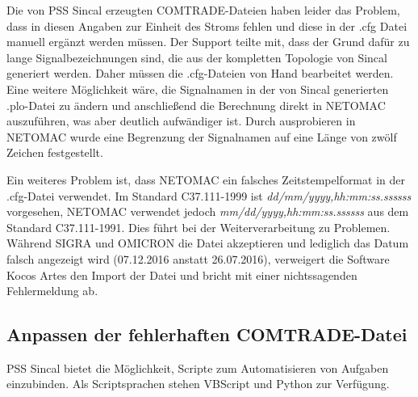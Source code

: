 \documentclass{scrartcl}
\begin{document}
\begin{onehalfspace}
Die von PSS Sincal erzeugten COMTRADE-Dateien haben leider das Problem, dass in diesen Angaben zur Einheit des Stroms fehlen und diese in der .cfg Datei manuell ergänzt werden müssen. Der Support teilte mit, dass der Grund dafür zu lange Signalbezeichnungen sind, die aus der kompletten Topologie von Sincal generiert werden. Daher müssen die .cfg-Dateien von Hand bearbeitet werden. Eine weitere Möglichkeit wäre, die Signalnamen in der von Sincal generierten .plo-Datei zu ändern und anschließend die Berechnung direkt in NETOMAC auszuführen, was aber deutlich aufwändiger ist. Durch ausprobieren in NETOMAC wurde eine Begrenzung der Signalnamen auf eine Länge von zwölf Zeichen festgestellt.

Ein weiteres Problem ist, dass NETOMAC ein falsches Zeitstempelformat in der .cfg-Datei verwendet. Im Standard C37.111-1999 ist \textit{dd/mm/yyyy,hh:mm:ss.ssssss} vorgesehen, NETOMAC verwendet jedoch \textit{mm/dd/yyyy,hh:mm:ss.ssssss} aus dem Standard C37.111-1991. Dies führt bei der Weiterverarbeitung zu Problemen. Während SIGRA und OMICRON die Datei akzeptieren und lediglich das Datum falsch angezeigt wird (07.12.2016 anstatt 26.07.2016), verweigert die Software Kocos Artes den Import der Datei und bricht mit einer nichtssagenden Fehlermeldung ab.

\subsection{Anpassen der fehlerhaften COMTRADE-Datei}
PSS Sincal bietet die Möglichkeit, Scripte zum Automatisieren von Aufgaben einzubinden. Als Scriptsprachen stehen VBScript und Python zur Verfügung.


\end{onehalfspace}
\end{document}
